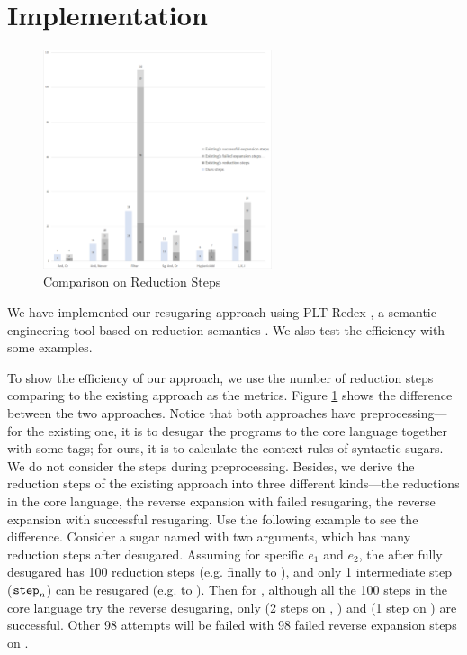 \section{Implementation}
\label{sec4}




\begin{figure}[thb]
	\centering
	\includegraphics[width=0.6\textwidth]{images/efficiency.png}
	\caption{Comparison on Reduction Steps}
	\label{fig:step}
\end{figure}
We have implemented our resugaring approach using PLT Redex \cite{SEwPR}, a semantic engineering tool based on reduction semantics \cite{reduction}. We also test the efficiency with some examples.

To show the efficiency of our approach, we use the number of reduction steps comparing to the existing approach as the metrics. Figure \ref{fig:step} shows the difference between the two approaches. Notice that both approaches have preprocessing---for the existing one, it is to desugar the programs to the core language together with some tags; for ours, it is to calculate the context rules of syntactic sugars. We do not consider the steps during preprocessing. Besides, we derive the reduction steps of the existing approach into three different kinds---the reductions in the core language, the reverse expansion with failed resugaring, the reverse expansion with successful resugaring.  Use the following example to see the difference. Consider a sugar named  with two arguments, which has many reduction steps after desugared. Assuming for specific $e_1$ and $e_2$, the  after fully desugared has 100 reduction steps (e.g. finally to \m{\false}), and only 1 intermediate step ($\mbox{\tt step}_n$) can be resugared (e.g. to ). Then for , although all the 100 steps in the core language try the reverse desugaring, only  (2 steps on , ) and  (1 step on ) are successful. Other 98 attempts will be failed with 98 failed reverse expansion steps on .

